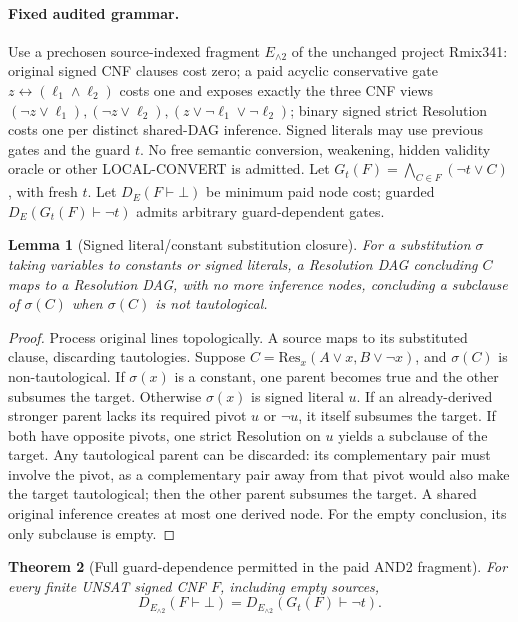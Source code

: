 \documentclass[11pt]{article}
\newtheorem{theorem}{Theorem}
\newtheorem{lemma}[theorem]{Lemma}
\begin{document}
\paragraph{Fixed audited grammar.}
Use a prechosen source-indexed fragment \(E_{\land2}\) of the unchanged project Rmix341: original signed CNF clauses cost zero; a paid acyclic conservative gate \(z\leftrightarrow(\ell_1\land\ell_2)\) costs one and exposes exactly the three CNF views \((\neg z\vee\ell_1),(\neg z\vee\ell_2),(z\vee\neg\ell_1\vee\neg\ell_2)\); binary signed strict Resolution costs one per distinct shared-DAG inference. Signed literals may use previous gates and the guard \(t\). No free semantic conversion, weakening, hidden validity oracle or other LOCAL-CONVERT is admitted.
Let \(G_t(F)=\bigwedge_{C\in F}(\neg t\vee C)\), with fresh \(t\). Let \(D_E(F\vdash\bot)\) be minimum paid node cost; guarded \(D_E(G_t(F)\vdash\neg t)\) admits arbitrary guard-dependent gates.
\begin{lemma}[Signed literal/constant substitution closure]
For a substitution \(\sigma\) taking variables to constants or signed literals, a Resolution DAG concluding \(C\) maps to a Resolution DAG, with no more inference nodes, concluding a subclause of \(\sigma(C)\) when \(\sigma(C)\) is not tautological.
\end{lemma}
\begin{proof}
Process original lines topologically. A source maps to its substituted clause, discarding tautologies. Suppose \(C=\mathrm{Res}_x(A\vee x,B\vee\neg x)\), and \(\sigma(C)\) is non-tautological. If \(\sigma(x)\) is a constant, one parent becomes true and the other subsumes the target. Otherwise \(\sigma(x)\) is signed literal \(u\). If an already-derived stronger parent lacks its required pivot \(u\) or \(\neg u\), it itself subsumes the target. If both have opposite pivots, one strict Resolution on \(u\) yields a subclause of the target. Any tautological parent can be discarded: its complementary pair must involve the pivot, as a complementary pair away from that pivot would also make the target tautological; then the other parent subsumes the target. A shared original inference creates at most one derived node. For the empty conclusion, its only subclause is empty.
\end{proof}
\begin{theorem}[Full guard-dependence permitted in the paid AND2 fragment]
For every finite UNSAT signed CNF \(F\), including empty sources,
\[
\boxed{D_{E_{\land2}}(F\vdash\bot)
=D_{E_{\land2}}(G_t(F)\vdash\neg t).}
\]
\end{theorem}
\end{document}
